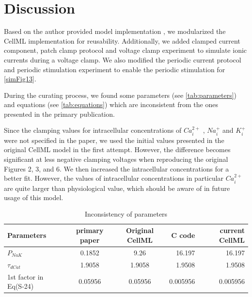 \documentclass[fleqn,10pt]{physiome}
\begin{document}
\section{Discussion}
\label{sec:discussion}

Based on the author provided model implementation \citep{poh2012quantitative}, we modularized the CellML implementation for reusability.
Additionally, we added clamped current component, patch clamp protocol and voltage clamp experiment to simulate ionic currents during a voltage clamp. We also modified the periodic current protocol and periodic stimulation experiment to enable the periodic stimulation for \autoref{simFig13}. 

During the curating process, we found some parameters (see \autoref{tab:parameters}) and equations (see \autoref{tab:equations}) which are inconsistent from the ones presented in the primary publication.

Since the clamping values for intracellular concentrations of $Ca_i^{2+}$ , $Na_i^+$ and $K_i^+$ were not specified in the paper, we used the initial values presented in the original CellML model in the first attempt. However, the difference becomes significant at less negative clamping voltages when reproducing the original Figures 2, 3, and 6. We then increased the intracellular concentrations for a better fit. However, the values of intracellular concentrations in particular $Ca_i^{2+}$ are quite larger than physiological value, which should be aware of in future usage of this model. 

\begin{table}[hbt!]\centering

\caption{Inconsistency of parameters}\label{tab:parameters}

\begin{tabular}{lccrr}
\toprule
Parameters & primary paper & Original CellML & C code & current CellML\\
\midrule
$P_{NaK}$ & 0.1852 & 9.26 & 16.197 & 16.197\\
$\tau_{dCat}$ & 1.9058 & 1.9058 & 1.9508 & 1.9508\\
1st factor in Eq(S-24) & 0.05956 & 0.05956 & 0.005956 & 0.005956\\
\bottomrule
\end{tabular}
\end{table}
\end{document}
